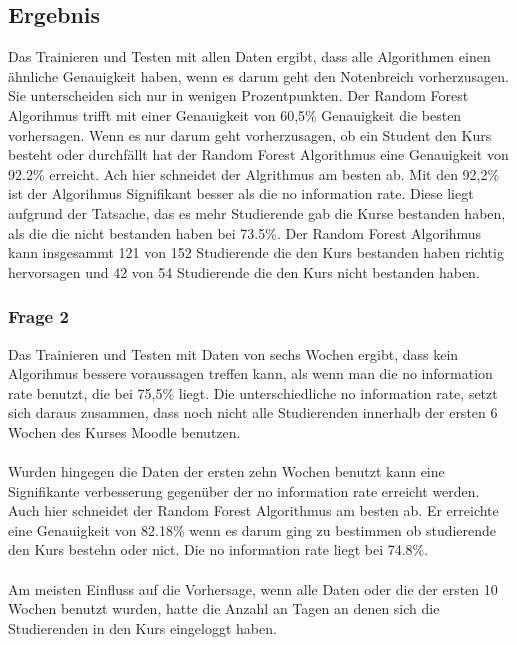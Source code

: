 \subsection{Ergebnis}
Das Trainieren und Testen mit allen Daten ergibt, dass alle Algorithmen einen ähnliche Genauigkeit haben, wenn es darum geht den Notenbreich vorherzusagen.
Sie unterscheiden sich nur in wenigen Prozentpunkten. Der Random Forest Algorihmus trifft mit einer Genauigkeit von 60,5\% Genauigkeit die besten vorhersagen.
Wenn es nur darum geht vorherzusagen, ob ein Student den Kurs besteht oder durchfällt hat der Random Forest Algorithmus eine Genauigkeit von 92.2\% erreicht. 
Ach hier schneidet der Algrithmus am besten ab. Mit den 92,2\% ist der Algorihmus Signifikant besser als die \glqq no information rate\grqq{}. 
Diese liegt aufgrund der Tatsache, das es mehr Studierende gab die Kurse bestanden haben, als die die nicht bestanden haben bei 73.5\%. 
Der Random Forest Algorihmus kann insgesammt 121 von 152 Studierende die den Kurs bestanden haben richtig hervorsagen und 42 von 54 Studierende die den Kurs nicht bestanden haben.

\subsubsection{Frage 2}
Das Trainieren und Testen mit Daten von sechs Wochen ergibt, dass kein Algorihmus bessere voraussagen treffen kann, als wenn man die \glqq no information rate\grqq{} benutzt,
die bei 75,5\% liegt. Die unterschiedliche \glqq no information rate\grqq{}, setzt sich daraus zusammen, dass noch nicht alle Studierenden innerhalb der ersten 6 Wochen des Kurses Moodle benutzen.
\\ \noindent \\ \noindent
Wurden hingegen die Daten der ersten zehn Wochen benutzt kann eine Signifikante verbesserung gegenüber der \glqq no information rate\grqq{} erreicht werden. 
Auch hier schneidet der Random Forest Algorithmus am besten ab. Er erreichte eine Genauigkeit von 82.18\% wenn es darum ging zu bestimmen ob studierende den Kurs bestehn oder nict.
Die \glqq no information rate\grqq{} liegt bei 74.8\%.
\\ \noindent \newline \noindent
\\ \noindent \newline \noindent
Am meisten Einfluss auf die Vorhersage, wenn alle Daten oder die der ersten 10 Wochen benutzt wurden, hatte die Anzahl an Tagen an denen sich die Studierenden in den Kurs eingeloggt haben.


